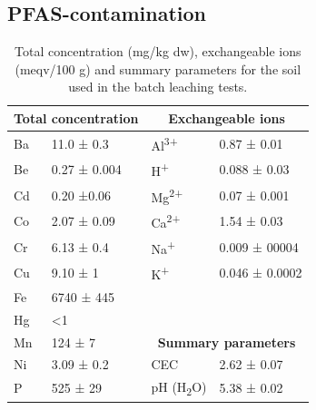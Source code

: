 \subsection{PFAS-contamination}

\begin{table}[htb]
\centering
\caption{Total concentration (mg/kg dw), exchangeable ions (meqv/100 g) and summary parameters for the soil used in the batch leaching tests.}
\label{tab:soil}
\begin{tabular}{llll} \toprule
\multicolumn{2}{c}{\textbf{Total concentration}} & \multicolumn{2}{c}{\textbf{Exchangeable ions}} \\ \hline \addlinespace
Ba                       & 11.0 ± 0.3                       & Al\textsuperscript{3+}                              & 0.87 ± 0.01              \\
Be                       & 0.27 ± 0.004                        & H\textsuperscript{+}                               & 0.088 ± 0.03              \\
Cd                       & 0.20 ±0.06                        & Mg\textsuperscript{2+}                              & 0.07 ± 0.001               \\
Co                       & 2.07 ± 0.09                         & Ca\textsuperscript{2+}                              & 1.54 ± 0.03              \\
Cr                       & 6.13 ± 0.4                        & Na\textsuperscript{+}                                 & 0.009 ± 00004                  \\
Cu                       & 9.10 ± 1                        & K\textsuperscript{+}                                 & 0.046 ± 0.0002                  \\
Fe                       & 6740 ± 445                     &                                   &                          \\
Hg                       & \textless{}1                       &                                   &                          \\
Mn                       & 124 ± 7                      & \multicolumn{2}{c}{\textbf{Summary parameters}}              \\  \cline{3-4} \addlinespace
Ni                       & 3.09 ± 0.2                        & CEC                               & 2.62 ± 0.07              \\
P                        & 525 ± 29                      & pH (H\textsubscript{2}O)                          & 5.38 ± 0.02              \\

\end{tabular}
\end{table}
